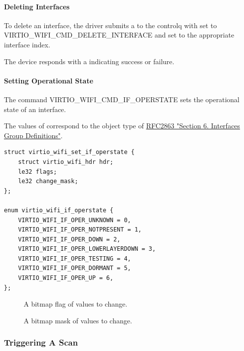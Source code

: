 \paragraph{Deleting Interfaces}\label{sec:Device Types / 802.11 Device / Device Operation / Interface Management / Deleting Interfaces}

To delete an interface, the driver submits a  to the controlq with  set to VIRTIO_WIFI_CMD_DELETE_INTERFACE and  set to the appropriate interface index.

The device responds with a  indicating success or failure.

\paragraph{Setting Operational State}\label{sec:Device Types / 802.11 Device / Device Operation / Interface Management / Setting Operational State}

The command VIRTIO_WIFI_CMD_IF_OPERSTATE sets the operational state of an interface.


The values of  correspond to the  object type of \hyperref[intro:rfc2863]{RFC2863 "Section 6. Interfaces Group Definitions"}.

\begin{lstlisting}
struct virtio_wifi_set_if_operstate {
	struct virtio_wifi_hdr hdr;
	le32 flags;
	le32 change_mask;
};

enum virtio_wifi_if_operstate {
	VIRTIO_WIFI_IF_OPER_UNKNOWN = 0,
	VIRTIO_WIFI_IF_OPER_NOTPRESENT = 1,
	VIRTIO_WIFI_IF_OPER_DOWN = 2,
	VIRTIO_WIFI_IF_OPER_LOWERLAYERDOWN = 3,
	VIRTIO_WIFI_IF_OPER_TESTING = 4,
	VIRTIO_WIFI_IF_OPER_DORMANT = 5,
	VIRTIO_WIFI_IF_OPER_UP = 6,
};
\end{lstlisting}

\begin{description}
\item[] A bitmap flag of values to change.
\item[] A bitmap mask of values to change.
\end{description}

\subsubsection{Triggering A Scan}\label{sec:Device Types / 802.11 Device / Device Operation / Scan}

